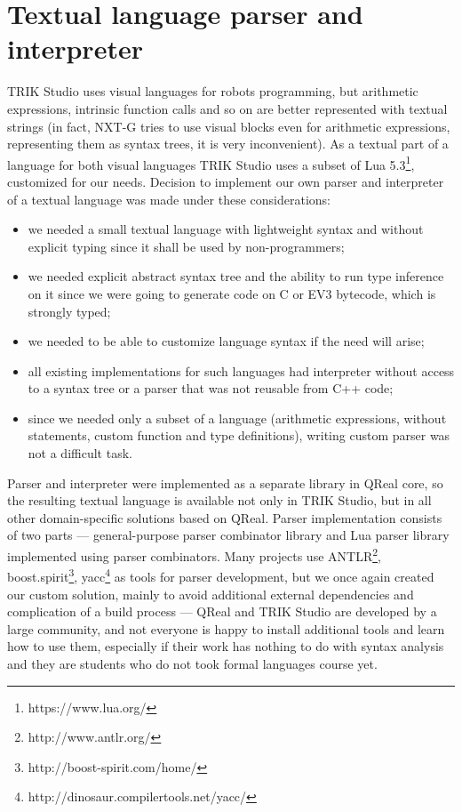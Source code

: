 \documentclass[conference]{IEEEtran}
\begin{document}
{\section{Textual language parser and interpreter}
\label{chapter:parser}
TRIK Studio uses visual languages for robots programming, but arithmetic expressions, intrinsic function calls and so on are better represented with textual strings (in fact, NXT-G tries to use visual blocks even for arithmetic expressions, representing them as syntax trees, it is very inconvenient). As a textual part of a language for both visual languages TRIK Studio uses a subset of Lua 5.3\footnote{https://www.lua.org/}, customized for our needs. Decision to implement our own parser and interpreter of a textual language was made under these considerations:
\begin{itemize}
	\item we needed a small textual language with lightweight syntax and without explicit typing since it shall be used by non-programmers;
	\item we needed explicit abstract syntax tree and the ability to run type inference on it since we were going to generate code on C or EV3 bytecode, which is strongly typed;
	\item we needed to be able to customize language syntax if the need will arise;
	\item all existing implementations for such languages had interpreter without access to a syntax tree or a parser that was not reusable from C++ code;
	\item since we needed only a subset of a language (arithmetic expressions, without statements, custom function and type definitions), writing custom parser was not a difficult task.
\end{itemize}

Parser and interpreter were implemented as a separate library in QReal core, so the resulting textual language is available not only in TRIK Studio, but in all other domain-specific solutions based on QReal. Parser implementation consists of two parts --- general-purpose parser combinator library and Lua parser library implemented using parser combinators. Many projects use ANTLR\footnote{http://www.antlr.org/}, boost.spirit\footnote{http://boost-spirit.com/home/}, yacc\footnote{http://dinosaur.compilertools.net/yacc/} as tools for parser development, but we once again created our custom solution, mainly to avoid additional external dependencies and complication of a build process --- QReal and TRIK Studio are developed by a large community, and not everyone is happy to install additional tools and learn how to use them, especially if their work has nothing to do with syntax analysis and they are students who do not took formal languages course yet.

}
\end{document}
